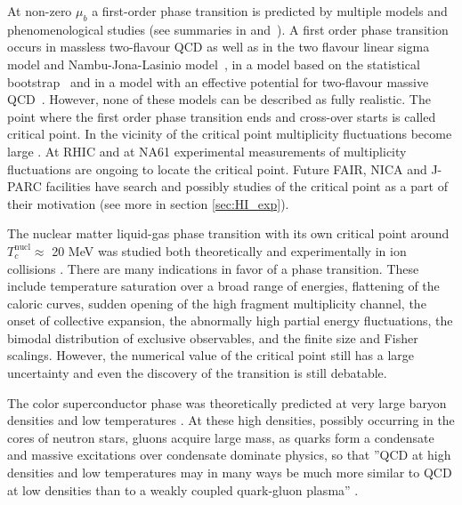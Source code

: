 At non-zero $\mu_b$ a first-order phase transition is predicted by multiple
models and phenomenological studies (see summaries in \cite{Stephanov:2004wx}
and~\cite{Lacey:2014wqa}). A first order phase transition occurs in massless
two-flavour QCD \cite{Berges:1998rc,Halasz:1998qr} as well as in the two flavour
linear sigma model and Nambu-Jona-Lasinio model~\cite{Scavenius:2000qd}, in a
model based on the statistical bootstrap~\cite{Antoniou:2002xq} and in a model
with an effective potential for two-flavour massive QCD~\cite{Hatta:2002sj}.
However, none of these models can be described as fully realistic.
The point where the first order phase transition ends and cross-over starts is
called critical point. In the vicinity of the critical point multiplicity
fluctuations become large \cite{Stephanov:2008qz,Stephanov:1999zu}. At RHIC
and at NA61 experimental measurements of multiplicity fluctuations are ongoing
to locate the critical point. Future FAIR, NICA and J-PARC facilities have
search and possibly studies of the critical point as a part of their motivation
(see more in section \ref{sec:HI_exp}).


The nuclear matter liquid-gas phase transition with its own critical point
around $T_c^{\mathrm{nucl}} \approx $ 20 MeV was studied both
theoretically and experimentally in ion collisions
\cite{Panagiotou:1984rb,DAgostino:2005qpq}. There are many indications in
favor of a phase transition. These include temperature saturation over a broad
range of energies, flattening of the caloric curves, sudden opening of the high
fragment multiplicity channel, the onset of collective expansion, the
abnormally high partial energy fluctuations, the bimodal distribution of
exclusive observables, and the finite size and Fisher scalings. However, the
numerical value of the critical point still has a large uncertainty and even the
discovery of the transition is still debatable.

The color superconductor phase was theoretically predicted at very large baryon
densities and low temperatures \cite{Alford:1998mk,Schafer:1999fe}. At these
high densities, possibly occurring in the cores of neutron stars, gluons acquire
large mass, as quarks form a condensate and massive excitations over condensate
dominate physics, so that ''QCD at high densities and low temperatures may in
many ways be much more similar to QCD at low densities than to a weakly coupled
quark-gluon plasma'' \cite{Rajagopal:1998ec}.

